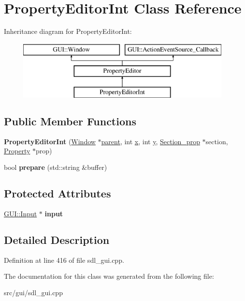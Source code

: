 \hypertarget{classPropertyEditorInt}{\section{Property\-Editor\-Int Class Reference}
\label{classPropertyEditorInt}
}
Inheritance diagram for Property\-Editor\-Int\-:\begin{figure}[H]
\begin{center}
\leavevmode
\includegraphics[height=3.000000cm]{classPropertyEditorInt}
\end{center}
\end{figure}
\subsection*{Public Member Functions}
\begin{DoxyCompactItemize}
\item 
\hypertarget{classPropertyEditorInt_a0f41557774e65f1aa6a57313f3ebf824}{{\bfseries Property\-Editor\-Int} (\hyperlink{classGUI_1_1Window_ae828e9daa964dfc65a3550fb03117d30}{Window} $\ast$\hyperlink{classGUI_1_1Window_a2e593ff65e7702178d82fe9010a0b539}{parent}, int \hyperlink{classGUI_1_1Window_a6ca6a80ca00c9e1d8ceea8d3d99a657d}{x}, int \hyperlink{classGUI_1_1Window_a0ee8e923aff2c3661fc2e17656d37adf}{y}, \hyperlink{classSection__prop}{Section\-\_\-prop} $\ast$section, \hyperlink{classProperty}{Property} $\ast$prop)}\label{classPropertyEditorInt_a0f41557774e65f1aa6a57313f3ebf824}

\item 
\hypertarget{classPropertyEditorInt_a5905c05b04394d9c0f9ee1c332df339e}{bool {\bfseries prepare} (std\-::string \&buffer)}\label{classPropertyEditorInt_a5905c05b04394d9c0f9ee1c332df339e}

\end{DoxyCompactItemize}
\subsection*{Protected Attributes}
\begin{DoxyCompactItemize}
\item 
\hypertarget{classPropertyEditorInt_a9723b1ce18a08a85bbef9edec6b9fa06}{\hyperlink{classGUI_1_1Input}{G\-U\-I\-::\-Input} $\ast$ {\bfseries input}}\label{classPropertyEditorInt_a9723b1ce18a08a85bbef9edec6b9fa06}

\end{DoxyCompactItemize}


\subsection{Detailed Description}


Definition at line 416 of file sdl\-\_\-gui.\-cpp.



The documentation for this class was generated from the following file\-:\begin{DoxyCompactItemize}
\item 
src/gui/sdl\-\_\-gui.\-cpp\end{DoxyCompactItemize}
